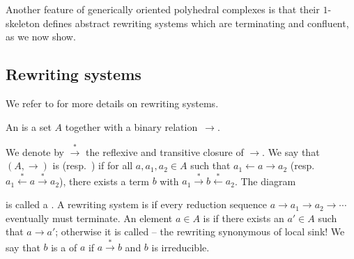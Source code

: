 \smallskip
Another feature of generically oriented polyhedral complexes is that their $1$-skeleton defines abstract rewriting systems which are terminating and confluent, as we now show.


\subsection{Rewriting systems}
\label{ss:abstract-rewriting}

We refer to \cite{baaderTermRewritingAll1998} for more details on rewriting systems. 
\begin{definition}
    An  is a set $A$ together with a binary relation~$\to$. 
\end{definition}
We denote by $\xrightarrow{*}$ the reflexive and transitive closure of ${\to}$. 
We say that $(A,\to)$ is  (resp.\ ) if for all $a,a_1,a_2 \in A$ such that $a_1 \leftarrow a \to a_2$ (resp.\ $a_1 \xleftarrow{*} a \xrightarrow{*} a_2$), there exists a term $b$ with $a_1 \xrightarrow{*} b \xleftarrow{*} a_2$.  
The diagram
\begin{center}
\end{center}
is called a .
A rewriting system is  if every reduction sequence $a \to a_1 \to a_2 \to \cdots$ eventually must terminate.
An element $a \in A$ is  if there exists an $a' \in A$ such that $a \to a'$; otherwise it is called  -- the rewriting synonymous of local sink!
We say that $b$ is a  of $a$ if $a \xrightarrow{*} b$ and $b$ is irreducible.

